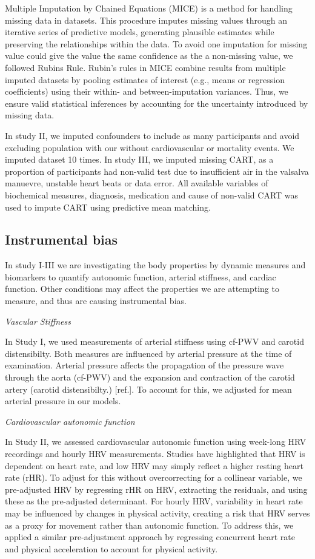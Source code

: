 \documentclass[
  a4paper,
  headsepline=true,
  open=any]{scrbook}
\begin{document}
Multiple Imputation by Chained Equations (MICE) is a method for handling
missing data in datasets. This procedure imputes missing values through
an iterative series of predictive models, generating plausible estimates
while preserving the relationships within the data. To avoid one
imputation for missing value could give the value the same confidence as
the a non-missing value, we followed Rubins Rule. Rubin's rules in MICE
combine results from multiple imputed datasets by pooling estimates of
interest (e.g., means or regression coefficients) using their within-
and between-imputation variances. Thus, we ensure valid statistical
inferences by accounting for the uncertainty introduced by missing data.

In study II, we imputed confounders to include as many participants and
avoid excluding population with our without cardiovascular or mortality
events. We imputed dataset 10 times. In study III, we imputed missing
CART, as a proportion of participants had non-valid test due to
insufficient air in the valsalva manuevre, unstable heart beats or data
error. All available variables of biochemical measures, diagnosis,
medication and cause of non-valid CART was used to impute CART using
predictive mean matching.

\hypertarget{instrumental-bias}{%
\subsection{Instrumental bias}\label{instrumental-bias}}

In study I-III we are investigating the body properties by dynamic
measures and biomarkers to quantify autonomic function, arterial
stiffness, and cardiac function. Other conditions may affect the
properties we are attempting to measure, and thus are causing
instrumental bias.

\emph{Vascular Stiffness}

In Study I, we used measurements of arterial stiffness using cf-PWV and
carotid distensibilty. Both measures are influenced by arterial pressure
at the time of examination. Arterial pressure affects the propagation of
the pressure wave through the aorta (cf-PWV) and the expansion and
contraction of the carotid artery (carotid distensibilty.) {[}ref.{]}.
To account for this, we adjusted for mean arterial pressure in our
models.

\emph{Cardiovascular autonomic function}

In Study II, we assessed cardiovascular autonomic function using
week-long HRV recordings and hourly HRV measurements. Studies have
highlighted that HRV is dependent on heart rate, and low HRV may simply
reflect a higher resting heart rate (rHR). To adjust for this without
overcorrecting for a collinear variable, we pre-adjusted HRV by
regressing rHR on HRV, extracting the residuals, and using these as the
pre-adjusted determinant. For hourly HRV, variability in heart rate may
be influenced by changes in physical activity, creating a risk that HRV
serves as a proxy for movement rather than autonomic function. To
address this, we applied a similar pre-adjustment approach by regressing
concurrent heart rate and physical acceleration to account for physical
activity.
\end{document}
